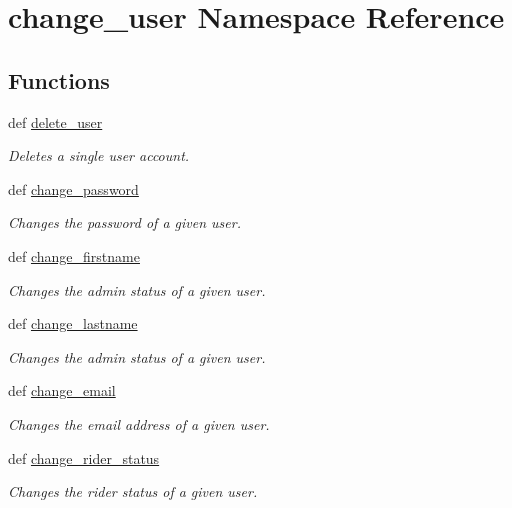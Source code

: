 \hypertarget{namespacechange__user}{\section{change\-\_\-user Namespace Reference}
\label{namespacechange__user}
}
\subsection*{Functions}
\begin{DoxyCompactItemize}
\item 
def \hyperlink{namespacechange__user_a659ef01da6a4d2b42bd2a1a7a20aff82}{delete\-\_\-user}
\begin{DoxyCompactList}\small\item\em Deletes a single user account. \end{DoxyCompactList}\item 
def \hyperlink{namespacechange__user_a55e4dca2c594cfd39754a01ce778ef9a}{change\-\_\-password}
\begin{DoxyCompactList}\small\item\em Changes the password of a given user. \end{DoxyCompactList}\item 
def \hyperlink{namespacechange__user_ad97543748a796599440f187d99aa27b7}{change\-\_\-firstname}
\begin{DoxyCompactList}\small\item\em Changes the admin status of a given user. \end{DoxyCompactList}\item 
def \hyperlink{namespacechange__user_abc383e3623dfdab816dfa9b8c8b364d2}{change\-\_\-lastname}
\begin{DoxyCompactList}\small\item\em Changes the admin status of a given user. \end{DoxyCompactList}\item 
def \hyperlink{namespacechange__user_a6ff2081ffbd4d5bf900401cf294a99d4}{change\-\_\-email}
\begin{DoxyCompactList}\small\item\em Changes the email address of a given user. \end{DoxyCompactList}\item 
def \hyperlink{namespacechange__user_a5458e60e6f6c560cae61bb44a3d5f2fc}{change\-\_\-rider\-\_\-status}
\begin{DoxyCompactList}\small\item\em Changes the rider status of a given user. \end{DoxyCompactList}\item 

\end{DoxyCompactItemize}
